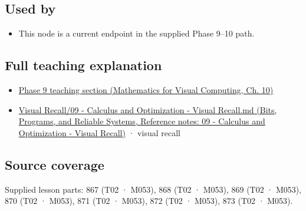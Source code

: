 \subsection{Used by}\label{appendix-54c8f5828387-used-by}

\begin{itemize}
\tightlist
\item
  This node is a current endpoint in the supplied Phase 9--10 path.
\end{itemize}

\subsection{Full teaching explanation}\label{appendix-54c8f5828387-full-teaching-explanation}

\begin{itemize}
\tightlist
\item
  \href{../02-Mathematics-for-Visual-Computing/main.pdf\#nameddest=02-foundations-ii-ch026-optimization-and-inverse-problems}{Phase 9 teaching section (Mathematics for Visual Computing, Ch. 10)}
\item
  \href{../01-Bits-Programs-and-Reliable-Systems/main.pdf\#nameddest=appendix-adf48f5dc5c1}{Visual Recall/09 - Calculus and Optimization - Visual Recall.md (Bits, Programs, and Reliable Systems, Reference notes: 09 - Calculus and Optimization - Visual Recall)} · visual recall
\end{itemize}

\subsection{Source coverage}\label{appendix-54c8f5828387-source-coverage}

Supplied lesson parts: 867 (T02 · M053), 868 (T02 · M053), 869 (T02 · M053), 870 (T02 · M053), 871 (T02 · M053), 872 (T02 · M053), 873 (T02 · M053).
